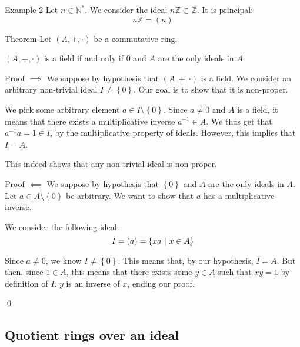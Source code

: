 \documentclass[a4paper]{article}
\begin{document}
\begin{parag}{Example 2}
    Let $n \in \mathbb{N}^*$. We consider the ideal $n \mathbb{Z} \subset \mathbb{Z}$. It is principal: 
    \[n\mathbb{Z} = \left(n\right)\]
\end{parag}

\begin{parag}{Theorem}
    Let $\left(A, +, \cdot \right)$ be a commutative ring.

    $\left(A, +, \cdot \right)$ is a field if and only if $0$ and $A$ are the only ideals in $A$.

    \begin{subparag}{Proof $\implies$}
        We suppose by hypothesis that $\left(A, +, \cdot \right)$ is a field. We consider an arbitrary non-trivial ideal $I \neq \left\{0\right\}$. Our goal is to show that it is non-proper.

        We pick some arbitrary element $a \in I \setminus \left\{0\right\}$. Since $a \neq 0$ and $A$ is a field, it means that there exists a multiplicative inverse $a^{-1} \in A$. We thus get that $a^{-1} a = 1 \in I$, by the multiplicative property of ideals. However, this implies that $I = A$.

        This indeed shows that any non-trivial ideal is non-proper.
    \end{subparag}

    \begin{subparag}{Proof $\impliedby$}
        We suppose by hypothesis that $\left\{0\right\}$ and $A$ are the only ideals in $A$. Let $a \in A \setminus \left\{0\right\}$ be arbitrary. We want to show that $a$ has a multiplicative inverse.

        We consider the following ideal:
        \[I = \left(a\right) = \left\{x a \suchthat x \in A\right\}\]

        Since $a \neq 0$, we know $I \neq \left\{0\right\}$. This means that, by our hypothesis, $I = A$. But then, since $1 \in A$, this means that there exists some $y \in A$ such that $xy = 1$ by definition of $I$. $y$ is an inverse of $x$, ending our proof.

        \qed
    \end{subparag}
\end{parag}

\subsection{Quotient rings over an ideal}
\end{document}
